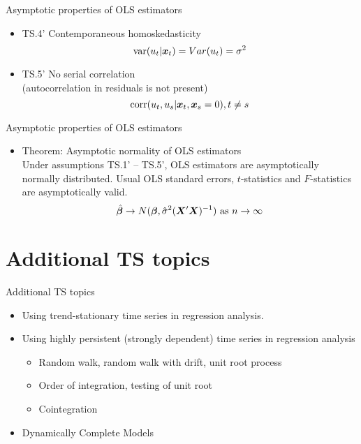 \documentclass{beamer}
\begin{document}

\begin{frame}{Asymptotic properties of OLS estimators}
\begin{itemize}
\item TS.4' Contemporaneous homoskedasticity
$$\textnormal{var}(u_t|\boldsymbol{x}_t)=Var(u_t)=\sigma^2$$

\vspace{0.5cm}

\item TS.5' No serial correlation \\(autocorrelation in residuals is not present)
$$\textnormal{corr}(u_t,u_s|\boldsymbol{x}_t,\boldsymbol{x}_s=0), t\neq s$$
\end{itemize}
\end{frame}


\begin{frame}{Asymptotic properties of OLS estimators}
\begin{itemize}
\item Theorem: Asymptotic normality of OLS estimators \\
\vspace{0.5cm}
Under assumptions TS.1' – TS.5', OLS estimators are asymptotically normally distributed. Usual OLS standard errors, $t$-statistics and $F$-statistics are asymptotically valid.
$$
\hat{\bm{\beta}} \rightarrow N(\bm{\beta}, \hat{\sigma}^2(\bm{X}^{\prime} \bm{X})^{-1} )
\textnormal{~as~} n \rightarrow \infty
$$
\end{itemize}
\end{frame}


\section{Additional TS topics}
\begin{frame}{Additional TS topics}
\begin{itemize}
\item Using trend-stationary time series in regression analysis.

\vspace{0.5cm}

\item Using highly persistent (strongly dependent) time series in regression analysis
\begin{itemize}
\item Random walk, random walk with drift, unit root
process
\item Order of integration, testing of unit root
\item Cointegration
\end{itemize}

\vspace{0.5cm}

\item Dynamically Complete Models
\end{itemize}
\end{frame}
\end{document}
